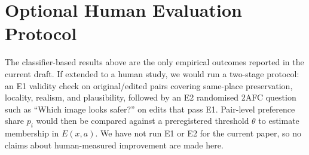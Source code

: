 \section{Optional Human Evaluation Protocol}

The classifier-based results above are the only empirical outcomes
reported in the current draft. If extended to a human study, we would
run a two-stage protocol: an E1 validity check on original/edited pairs
covering same-place preservation, locality, realism, and plausibility,
followed by an E2 randomised 2AFC question such as ``Which image looks
safer?'' on edits that pass E1. Pair-level preference share $p_i$ would
then be compared against a preregistered threshold $\theta$ to estimate
membership in $E(x,a)$. We have not run E1 or E2 for the current paper,
so no claims about human-measured improvement are made here.
